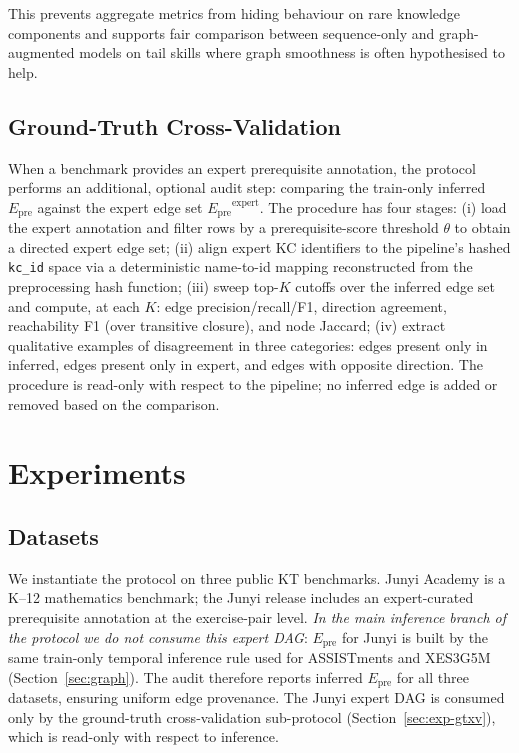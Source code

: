 \documentclass[runningheads]{llncs}
\newcommand{\Epre}{\ensuremath{E_{\text{pre}}}}
\newcommand{\KCs}{knowledge components}
\begin{document}
This prevents aggregate metrics from hiding behaviour on rare \KCs{} and
supports fair comparison between sequence-only and graph-augmented models
on tail skills where graph smoothness is often hypothesised to help.
\subsection{Ground-Truth Cross-Validation}
\label{sec:gtxv-protocol}
When a benchmark provides an expert prerequisite annotation, the
protocol performs an additional, optional audit step: comparing the
train-only inferred $\Epre$ against the expert edge set
$\Epre^{\text{expert}}$. The procedure has four stages:
(i) load the expert annotation and filter rows by a prerequisite-score
threshold $\theta$ to obtain a directed expert edge set;
(ii) align expert KC identifiers to the pipeline's hashed \texttt{kc\_id}
space via a deterministic name-to-id mapping reconstructed from the
preprocessing hash function;
(iii) sweep top-$K$ cutoffs over the inferred edge set and compute,
at each $K$: edge precision/recall/F1, direction agreement, reachability
F1 (over transitive closure), and node Jaccard;
(iv) extract qualitative examples of disagreement in three categories:
edges present only in inferred, edges present only in expert, and edges
with opposite direction.
The procedure is read-only with respect to the pipeline; no
inferred edge is added or removed based on the comparison.
\section{Experiments}
\label{sec:exp}
\subsection{Datasets}
\label{sec:datasets}
We instantiate the protocol on three public KT benchmarks. Junyi Academy
\cite{junyi_dataset} is a K--12 mathematics benchmark; the Junyi release
includes an expert-curated prerequisite annotation at the
exercise-pair level. \emph{In the main inference branch of the protocol
we do not consume this expert DAG}: $\Epre$ for Junyi is built by the
same train-only temporal inference rule used for ASSISTments and
XES3G5M (Section~\ref{sec:graph}). The audit therefore reports inferred
$\Epre$ for all three datasets, ensuring uniform edge provenance. The
Junyi expert DAG is consumed only by the ground-truth cross-validation
sub-protocol (Section~\ref{sec:exp-gtxv}), which is read-only with
respect to inference.
\end{document}
